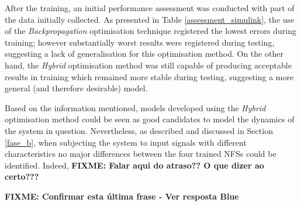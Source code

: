 \documentclass[11pt]{article}
\begin{document}
After the training, an initial performance assessment was conducted with part of the data initially collected. As presented in Table \ref{assessment_simulink}, the use of the \emph{Backpropagation} optimisation technique registered the lowest errors during training; however substantially worst results were registered during testing, suggesting a lack of generalisation for this optimisation method. On the other hand, the \emph{Hybrid} optimisation method was still capable of producing acceptable results in training which remained more stable during testing, suggesting a more general (and therefore desirable) model.

Based on the information mentioned, models developed using the \emph{Hybrid} optimisation method could be seen as good candidates to model the dynamics of the system in question. Nevertheless, as described and discussed in Section \ref{fase_b}, when subjecting the system to input signals with different characteristics no major differences between the four trained NFSs could be identified. Indeed, \textbf{FIXME: Falar aqui do atraso?? O que dizer ao certo???}

\textbf{FIXME: Confirmar esta última frase - Ver resposta Blue}
\end{document}

